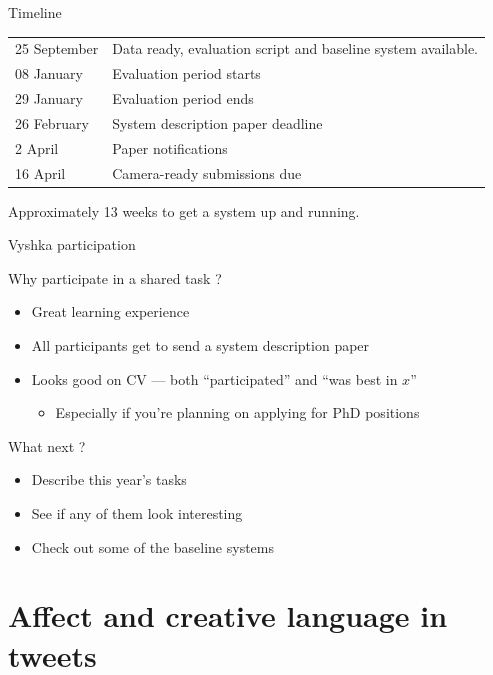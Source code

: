 \documentclass[10pt, compress]{beamer}
\begin{document}
\begin{frame}{Timeline}

\begin{tabular}{ll}

25 September & Data ready, evaluation script and baseline system available. \\
08 January   & Evaluation period starts \\
29 January   & Evaluation period ends \\
26 February  & System description paper deadline \\
2  April     & Paper notifications \\
16 April     & Camera-ready submissions due \\
\end{tabular}

Approximately 13 weeks to get a system up and running.

\end{frame}

\begin{frame}{Vyshka participation}

Why participate in a shared task ? 

\begin{itemize}
  \item Great learning experience
  \item All participants get to send a system description paper
  \item Looks good on CV --- both ``participated'' and ``was best in $x$''
  \begin{itemize}
    \item Especially if you're planning on applying for PhD positions
  \end{itemize}
\end{itemize}

What next ? 
\begin{itemize}
  \item Describe this year's tasks 
  \item See if any of them look interesting
  \item Check out some of the baseline systems 
\end{itemize}

\end{frame}

\section{Affect and creative language in tweets}
\end{document}
